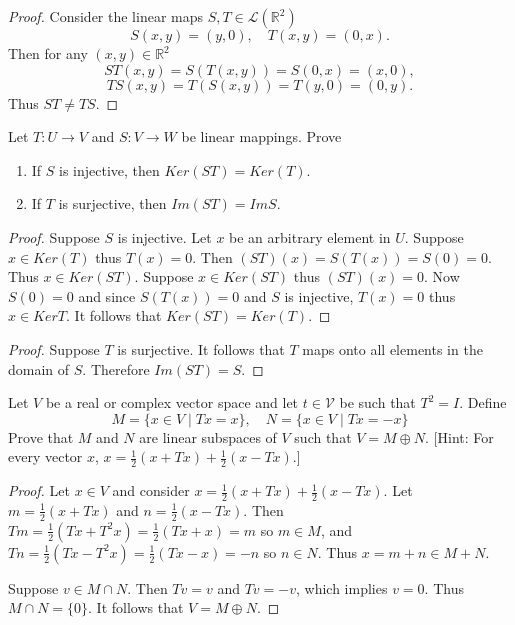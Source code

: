 \begin{proof}
    Consider the linear maps $S, T \in \mathcal{L}(\mathbb{R}^2)$
    \[
    S(x, y) = (y, 0), \quad T(x, y) = (0, x).
    \]
    Then for any $(x, y) \in \mathbb{R}^2$
    \[
    ST(x, y) = S(T(x, y)) = S(0, x) = (x, 0),
    \]
    \[
    TS(x, y) = T(S(x, y)) = T(y, 0) = (0, y).
    \]
    Thus $ST \ne TS$.
\end{proof}

\begin{tcolorbox}[title=Problem 15, breakable]
    Let $T : U \longrightarrow V$ and $S : V \longrightarrow W$
    be linear mappings. Prove 
    \begin{enumerate}
        \item If $S$ is injective, then $Ker(ST) = Ker(T)$.
        \item If $T$ is surjective, then $Im(ST) = Im S$.
    \end{enumerate}
\end{tcolorbox}

\begin{proof}
    Suppose $S$ is injective.
    Let $x$ be an arbitrary element in $U$.
    Suppose $x \in Ker(T)$ thus $T(x) = 0$.
    Then $(ST)(x) = S(T(x)) = S(0) = 0$.
    Thus $x \in Ker(ST)$.
    Suppose $x \in Ker(ST)$ thus $(ST)(x) = 0$.
    Now $S(0) = 0$ and since $S(T(x)) = 0$ and $S$ is injective, $T(x) = 0$ thus $x \in Ker T$.
    It follows that $Ker(ST) = Ker(T)$.
\end{proof}

\begin{proof}
    Suppose $T$ is surjective.
    It follows that $T$ maps onto all elements in the domain of $S$.
    Therefore $Im (ST) = S$.
\end{proof}

\begin{tcolorbox}[title=Problem 16, breakable]
    Let $V$ be a real or complex vector space and let $t \in \mathcal{V}$
        be such that $T^2 = I$. Define 
        \[M = \{x \in V \mid Tx = x\}, \quad N = \{x \in V \mid Tx = -x\}\]
        Prove that $M$ and $N$ are linear subspaces of $V$ such that $V = M \oplus N$.
    [Hint: For every vector $x$, $x = \frac{1}{2}(x + Tx) + \frac{1}{2}(x - Tx)$.]
\end{tcolorbox}

\begin{proof}
    Let $x \in V$ and consider $x = \frac{1}{2}(x + Tx) + \frac{1}{2}(x - Tx)$.
    Let $m = \frac{1}{2}(x + Tx)$ and $n = \frac{1}{2}(x - Tx)$. 
    Then $Tm = \frac{1}{2}(Tx + T^2x) = \frac{1}{2}(Tx + x) = m$ so $m \in M$, 
    and $Tn = \frac{1}{2}(Tx - T^2x) = \frac{1}{2}(Tx - x) = -n$ so $n \in N$. 
    Thus $x = m + n \in M + N$.

    Suppose $v \in M \cap N$.
    Then $Tv = v$ and $Tv = -v$, which implies $v = 0$.
    Thus $M \cap N = \{0\}$.
    It follows that $V = M \oplus N$.
\end{proof}

